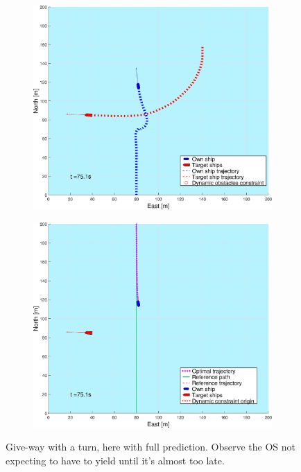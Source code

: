 \begin{figure}[ht!]
\begin{subfigure}[b]{0.494\textwidth}
        \subcaption{}
    \end{subfigure}
    \hfill
    \\
    \begin{subfigure}[b]{0.494\textwidth}
        \centering
        \includegraphics[width=\textwidth]{Images/Figures/sving_GW/_Simple_0fig1_time=75}
        \subcaption{}
    \end{subfigure}
    \hfill
    \begin{subfigure}[b]{0.494\textwidth}
        \centering
        \includegraphics[width=\textwidth]{Images/Figures/sving_GW/_Simple_0fig999_time=75}
        \subcaption{}
    \end{subfigure}
    \hfill
    \caption{Give-way with a turn, here with full prediction. Observe the \gls{OS} not expecting to have to yield until it's almost too late.}
    \label{FIG: turn GW full pred}
\end{figure}%
